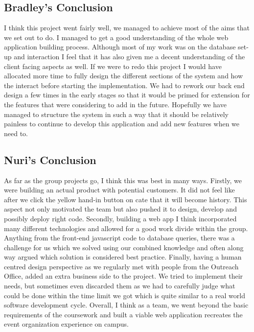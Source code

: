 \documentclass[10pt,a4paper]{article}
\begin{document}
 \subsection{Bradley's Conclusion}
 I think this project went fairly well, we managed to achieve most of the aims 
that we set out to do. I managed to get a good understanding of the whole web 
application building process. Although most of my work was on the database 
set-up and interaction I feel that it has also given me a decent understanding 
of the client facing aspects as well. If we were to redo this project I would 
have allocated more time to fully design the different sections of the system 
and how the interact before starting the implementation. We had to rework our 
back end design a few times in the early stages so that it would be primed for 
extension for the features that were considering to add in the future. Hopefully 
we have managed to structure the system in such a way that it should be 
relatively painless to continue to develop this application and add new features 
when we need to.  

 \subsection{Nuri's Conclusion}
 As far as the group projects go, I think this was best in many ways. Firstly, 
we were building an actual product with potential customers. It did not feel 
like after we click the yellow hand-in button on cate that it will become 
history. This aspect not only motivated the team but also pushed it to design, 
develop and possibly deploy right code. Secondly, building a web app I think 
incorporated many different technologies and allowed for a good work divide 
within the group. Anything from the front-end javascript code to database 
queries, there was a challenge for us which we solved using our combined 
knowledge and often along way argued which solution is considered best practice. 
Finally, having a human centred design perspective as we regularly met with 
people from the Outreach Office, added an extra business side to the project. We 
tried to implement their needs, but sometimes even discarded them as we had to 
carefully judge what could be done within the time limit we got which is quite 
similar to a real world software development cycle. Overall, I think as a team, 
we went beyond the basic requirements of the coursework and built a viable web 
application recreates the event organization experience on campus.
\end{document}
